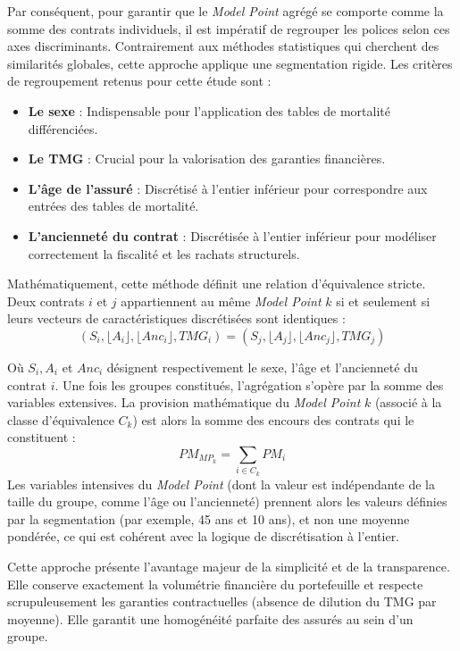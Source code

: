 Par conséquent, pour garantir que le \textit{Model Point} agrégé se comporte comme la somme des contrats individuels, il est impératif de regrouper les polices selon ces axes discriminants. Contrairement aux méthodes statistiques qui cherchent des similarités globales, cette approche applique une segmentation rigide. Les critères de regroupement retenus pour cette étude sont :
\begin{itemize}
    \item \textbf{Le sexe} : Indispensable pour l'application des tables de mortalité différenciées.
    \item \textbf{Le TMG} : Crucial pour la valorisation des garanties financières.
    \item \textbf{L'âge de l'assuré} : Discrétisé à l'entier inférieur pour correspondre aux entrées des tables de mortalité.
    \item \textbf{L'ancienneté du contrat} : Discrétisée à l'entier inférieur pour modéliser correctement la fiscalité et les rachats structurels.
\end{itemize}

Mathématiquement, cette méthode définit une relation d'équivalence stricte. Deux contrats $i$ et $j$ appartiennent au même \textit{Model Point} $k$ si et seulement si leurs vecteurs de caractéristiques discrétisées sont identiques :
\begin{equation}
(S_i, \lfloor A_i \rfloor, \lfloor Anc_i \rfloor, TMG_i) = (S_j, \lfloor A_j \rfloor, \lfloor Anc_j \rfloor, TMG_j)
\end{equation}

Où $S_i, A_i$ et $Anc_i$ désignent respectivement le sexe, l'âge et l'ancienneté du contrat $i$. Une fois les groupes constitués, l'agrégation s'opère par la somme des variables extensives. La provision mathématique du \textit{Model Point} $k$ (associé à la classe d'équivalence $C_k$) est alors la somme des encours des contrats qui le constituent :
\begin{equation}
PM_{MP_k} = \sum_{i \in C_k} PM_i
\end{equation}
Les variables intensives du \textit{Model Point} (dont la valeur est indépendante de la taille du groupe, comme l'âge ou l'ancienneté) prennent alors les valeurs définies par la segmentation (par exemple, 45 ans et 10 ans), et non une moyenne pondérée, ce qui est cohérent avec la logique de discrétisation à l'entier.

Cette approche présente l'avantage majeur de la simplicité et de la transparence. Elle conserve exactement la volumétrie financière du portefeuille et respecte scrupuleusement les garanties contractuelles (absence de dilution du TMG par moyenne). Elle garantit une homogénéité parfaite des assurés au sein d'un groupe.


